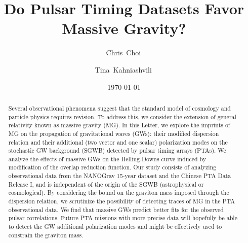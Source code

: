 \documentclass[10pt,prd,twocolumn,aps,nofootinbib,nobibnotes,superscriptaddress,preprintnumbers]{revtex4-2}
\begin{document}
\title{Do Pulsar Timing Datasets Favor Massive Gravity?}

\date{\today}
\author{Chris~Choi\,}

\author{Tina~Kahniashvili\,}

\begin{abstract}

Several observational phenomena suggest that the standard model of cosmology and particle physics requires revision. To address this, we consider the extension of general relativity known as massive gravity (MG). In this Letter, we explore the imprints of MG on the propagation of gravitational waves (GWs): their modified dispersion relation and their additional (two vector and one scalar) polarization modes on the stochastic GW background (SGWB) detected by pulsar timing arrays (PTAs). We analyze the effects of massive GWs on the Helling-Downs curve induced by modification of the overlap reduction function. Our study consists of analyzing observational data from the NANOGrav 15-year dataset and the Chinese PTA Data Release I, and is independent of the origin of the SGWB (astrophysical or cosmological). By considering the bound on the graviton mass imposed through the dispersion relation, we scrutinize the possibility of detecting traces of MG in the PTA observational data. We find that massive GWs predict better fits for the observed pulsar correlations. Future PTA missions with more precise data will hopefully be able to detect the GW additional polarization modes and might be effectively used to constrain the graviton mass.
\end{abstract}

\maketitle
\end{document}
